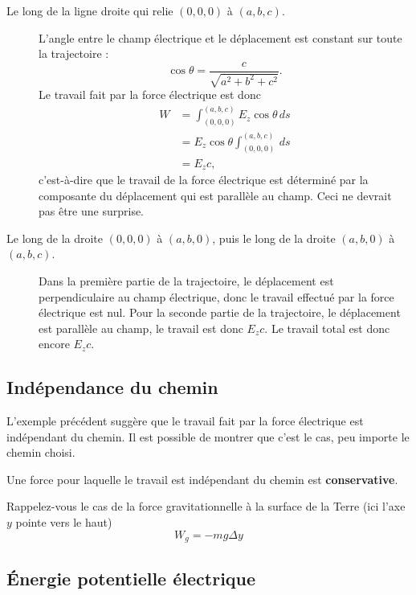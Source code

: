 \begin{description}
  \item[Le long de la ligne droite qui relie $(0,0,0)$ à $(a,b,c)$.]

    L'angle entre le champ électrique et le déplacement est constant sur toute
    la trajectoire :
    \[
      \cos \theta = \frac{c}{\sqrt{a^2 + b^2 + c^2}}.
    \]
    Le travail fait par la force électrique est donc
    \begin{align*}
      W &= \int_{(0,0,0)}^{(a,b,c)} E_z \cos \theta \, ds \\
        &= E_z \cos \theta \int_{(0,0,0)}^{(a,b,c)}\, ds \\
        &= E_z c,
    \end{align*}
    c'est-à-dire que le travail de la force électrique est déterminé par la
    composante du déplacement qui est parallèle au champ. Ceci ne devrait pas
    être une surprise.

  \item[Le long de la droite $(0,0,0)$ à $(a,b,0)$, puis le long de la droite
    $(a,b,0)$ à $(a,b,c)$.]

    Dans la première partie de la trajectoire, le déplacement est
    perpendiculaire au champ électrique, donc le travail effectué par la force
    électrique est nul. Pour la seconde partie de la trajectoire, le
    déplacement est parallèle au champ, le travail est donc  $E_z c$. Le
    travail total est donc encore $E_z c$.
\end{description}


\subsection*{Indépendance du chemin}


L'exemple précédent suggère que le travail fait par la force électrique est
indépendant du chemin. Il est possible de montrer que c'est le cas, peu importe
le chemin choisi.

Une force pour laquelle le travail est indépendant du chemin est
\textbf{conservative}.

Rappelez-vous le cas de la force gravitationnelle à la surface de la Terre (ici
l'axe $y$ pointe vers le haut)
$$W_g = -mg \Delta y$$


\subsection*{Énergie potentielle électrique}


